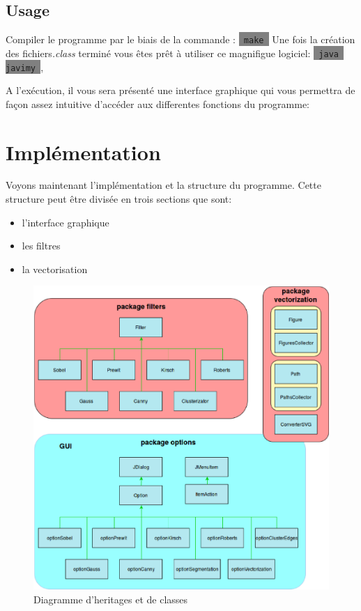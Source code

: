 \documentclass[twoside,openright,a4paper,11pt,french]{article}
\begin{document}
\bigbreak
\subsection{Usage}
Compiler le programme par le biais de la commande : 
\colorbox{gray}{\lstinline[basicstyle=\ttfamily\color{black}]| make |}
Une fois la création des fichiers{\it .class} terminé vous êtes prêt
à utiliser ce magnifigue logiciel: 
\colorbox{gray}{\lstinline[basicstyle=\ttfamily\color{black}]| java javimy |},

\vspace{1cm}
A l'exécution, il vous sera présenté une interface graphique qui vous
permettra de façon assez intuitive d'accéder aux differentes fonctions
du programme:

\section{Implémentation}
Voyons maintenant l'implémentation et la structure du programme.
Cette structure peut être divisée en trois sections que sont:
\begin{itemize}
\item l'interface graphique
\item les filtres
\item la vectorisation
\end{itemize}

\begin{figure}[h]
\centering
\includegraphics[width=12cm]{./pics/classes.eps}
\caption{Diagramme d’heritages et de classes}
\end{figure}
\end{document}
